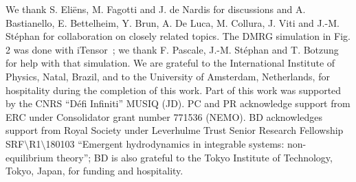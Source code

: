 \documentclass[twocolumn,amsfonts,showpacs,superscriptaddress]{revtex4-1}
\begin{document}
 
\vspace{0.1cm}
\begin{acknowledgments}
We thank S. Eli\"ens, M. Fagotti and J. de Nardis for discussions and A. Bastianello, E. Bettelheim, Y. Brun, A. De Luca, M. Collura, J. Viti and J.-M. St\'ephan for  collaboration on closely related topics. The DMRG simulation in Fig. 2 was done with iTensor~\cite{itensor}; we thank F. Pascale, J.-M. St\' ephan and T. Botzung for help with that simulation. We are grateful to the International Institute of Physics, Natal, Brazil, and to the University of Amsterdam, Netherlands, for hospitality during the completion of this work. Part of this work was supported by the CNRS ``D\'efi Infiniti'' MUSIQ (JD). PC and PR acknowledge support from ERC under Consolidator grant number 771536 (NEMO). BD acknowledges support from Royal Society under Leverhulme Trust Senior Research Fellowship SRF$\setminus$R1$\setminus$180103 ``Emergent hydrodynamics in integrable systems: non-equilibrium theory''; BD is also grateful to the Tokyo Institute of Technology, Tokyo, Japan, for funding and hospitality.
\end{acknowledgments}








\newpage
\end{document}
